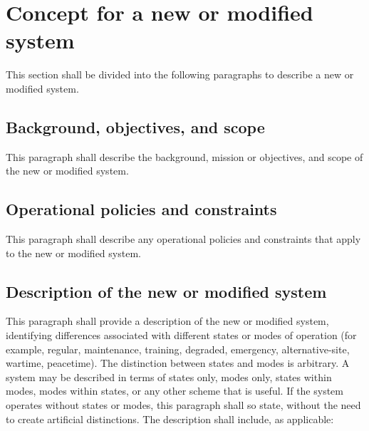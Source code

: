 \documentclass{fidata-report-template}
\begin{document}
\section{Concept for a new or modified system}

This section shall be divided into the following paragraphs to describe
a new or modified system.

\subsection{Background, objectives, and scope}

This paragraph shall describe the background, mission or objectives, and
scope of the new or modified system.

\subsection{Operational policies and constraints}

This paragraph shall describe any operational policies and constraints
that apply to the new or modified system.

\subsection{Description of the new or modified system}

This paragraph shall provide a description of the new or modified
system, identifying differences associated with different states or
modes of operation (for example, regular, maintenance, training,
degraded, emergency, alternative-site, wartime, peacetime). The
distinction between states and modes is arbitrary. A system may be
described in terms of states only, modes only, states within modes,
modes within states, or any other scheme that is useful. If the system
operates without states or modes, this paragraph shall so state, without
the need to create artificial distinctions. The description shall
include, as applicable:
\end{document}
